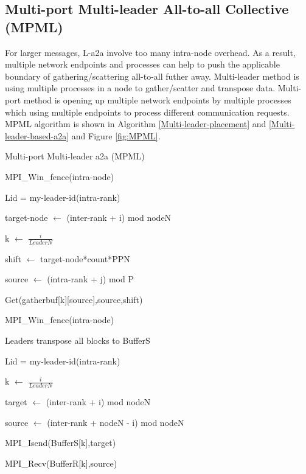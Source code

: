 \subsection{Multi-port Multi-leader All-to-all Collective (MPML)}
For larger messages, L-a2a involve too many intra-node overhead.
As a result, multiple network endpoints and processes can help to push the applicable boundary of gathering/scattering all-to-all futher away.
Multi-leader method is using multiple processes in a node to gather/scatter and transpose data.
Multi-port method is opening up multiple network endpoints by multiple processes which using multiple endpoints to process different communication requests.
MPML algorithm is shown in Algorithm \ref{Multi-leader-placement} and \ref{Multi-leader-based-a2a}  and Figure \ref{fig:MPML}.


\begin{algorithm}
\caption{Multi-port Multi-leader a2a (MPML)}\label{Multi-leader-based-a2a}
\SetAlgoLined
{}

{
	MPI\_Win\_fence(intra-node)

	{
		Lid = my-leader-id(intra-rank)

		{
			target-node $\leftarrow$ (inter-rank + i) mod nodeN

			k $\leftarrow$ $\frac{i}{LeaderN}$

			shift $\leftarrow$ target-node*count*PPN

			{
				source $\leftarrow$ (intra-rank + j) mod P

				Get(gatherbuf[k][source],source,shift)
			}
		}
	}
	MPI\_Win\_fence(intra-node)
		
	Leaders transpose all blocks to BufferS
}
{
	{
		Lid = my-leader-id(intra-rank)

		{
			k $\leftarrow$ $\frac{i}{LeaderN}$

			target $\leftarrow$  (inter-rank + i) mod nodeN

			source $\leftarrow$  (inter-rank + nodeN - i) mod nodeN

			MPI\_Isend(BufferS[k],target)

			MPI\_Recv(BufferR[k],source)
		}

	}
	
}
\end{algorithm}

